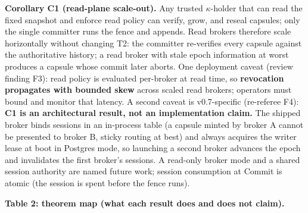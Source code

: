 \documentclass[
  11pt,
]{article}
\begin{document}
\textbf{Corollary C1 (read-plane scale-out).} Any trusted $\kappa$-holder that can read the fixed snapshot and enforce read policy can verify, grow, and reseal capsules; only the single committer runs the fence and appends. Read brokers therefore scale horizontally without changing T2: the committer re-verifies every capsule against the authoritative history; a read broker with stale epoch information at worst produces a capsule whose commit later aborts. One deployment caveat (review finding F3): read policy is evaluated per-broker at read time, so \textbf{revocation propagates with bounded skew} across scaled read brokers; operators must bound and monitor that latency. A second caveat is v0.7-specific (re-referee F4): \textbf{C1 is an architectural result, not an implementation claim.} The shipped broker binds sessions in an in-process table (a capsule minted by broker A cannot be presented to broker B, sticky routing at best) and always acquires the writer lease at boot in Postgres mode, so launching a second broker advances the epoch and invalidates the first broker's sessions. A read-only broker mode and a shared session authority are named future work; session consumption at Commit is atomic (the session is spent before the fence runs).

\textbf{Table 2: theorem map (what each result does and does not claim).}
\end{document}
